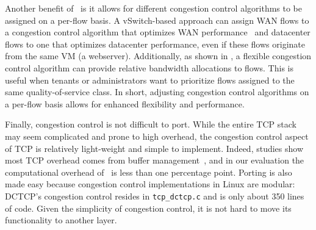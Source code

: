 Another benefit of~\acdc{} is it allows for different congestion control algorithms to be assigned on
a per-flow basis. %
A vSwitch-based approach can assign WAN flows to a congestion control algorithm that optimizes WAN performance~\cite{tan2006compound,flach2013reducing} and
datacenter flows to one that optimizes datacenter performance, even if these flows originate from the same VM (\eg{}a webserver).
Additionally, as shown in , a flexible congestion control algorithm can provide relative bandwidth allocations to flows.
This is useful when tenants or administrators want to prioritize flows assigned to the same quality-of-service class.
In short, adjusting congestion control algorithms on a per-flow basis allows for 
enhanced flexibility and performance.

Finally, congestion control is not difficult to port. While the entire TCP stack may seem complicated and prone to high overhead,
the congestion control aspect of TCP is relatively light-weight and simple to implement. Indeed, studies
show most TCP overhead comes from buffer management~\cite{optimize-tcp-receive}, and
in our evaluation the computational overhead of~\acdc{} is less than one percentage point.
Porting is also made easy because congestion control implementations in Linux
are modular: DCTCP's congestion control resides in {\tt tcp\_dctcp.c} and is only about 350 lines of code. Given
the simplicity of congestion control, it is not hard to move its functionality to another
layer.


